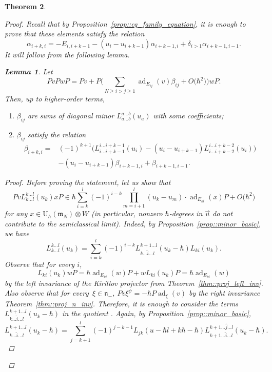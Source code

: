 \documentclass[10pt,a4paper]{article}
\numberwithin{equation}{section}
\newtheorem{Theorem}{Theorem}[section]
\newtheorem{Lemma}[Theorem]{Lemma}
\newcommand{\U}{\mathrm{U}_{\hbar}}
\newcommand{\n}{\mathfrak{n}}
\newcommand{\m}{\mathfrak{m}}
\DeclareMathOperator{\ad}{ad}
\begin{document}
\begin{Theorem}
\begin{proof}
			Recall that by Proposition~\ref{prop::cg_family_equation}, it is enough to prove that these elements satisfy the relation
			\[
			\alpha_{i+k,i} = -E_{i,i+k-1} - (u_i-u_{i+k-1}) \alpha_{i+k-1,i} + \delta_{i > 1} \alpha_{i+k-1,i-1}.
			\]
			It will follow from the following lemma.
			\begin{Lemma}
				Let
				\[
				PvPwP = Pv + P\biggl( \sum\limits_{N \geq i > j \geq 1} \ad_{E_{ij}}(v) \beta_{ij} + O\bigl(\hbar^2\bigr)\biggr)wP.
				\]
				Then, up to higher-order terms,
				\begin{enumerate}\itemsep=0pt
					\item[$(1)$] $\beta_{ij}$ are sums of diagonal minor $L_{a\dots b}^{a\dots b}(u_a)$ with some coefficients;
					\item[$(2)$] $\beta_{ij}$ satisfy the relation
					\begin{align}
							\beta_{i+k,i} ={}& (-1)^{k+1}\bigl(L_{i\dots i+k-1}^{i\dots i+k-1}(u_i) - (u_i - u_{i+k-1}) L_{i \dots i+k-2}^{i \dots i+k-2}(u_i)\bigr)\nonumber \\
							&-(u_i - u_{i+k-1}) \beta_{i+k-1,i} + \beta_{i+k-1,i-1}.\label{eq::beta_relation}
					\end{align}
				\end{enumerate}
				\begin{proof}
					Before proving the statement, let us show that
					\[
					Pv L_{k\dots l}^{k \dots l}(u_k) x P \in \hbar \sum\limits_{i=k}^l (-1)^{i-k} \prod_{m=i+1}^l (u_k - u_m) \cdot \ad_{E_{ki}}(x) P + O\bigl(\hbar^2\bigr)
					\]
					for any $x\in \U(\m_N) \otimes W$ (in particular, nonzero $\hbar$-degrees in $\vec{u}$ do not contribute to the semiclassical limit). Indeed, by Proposition~\ref{prop::minor_basic}, we have
					\[
					L_{k \dots l}^{k \dots l}(u_k) = \sum\limits_{i=k}^l (-1)^{i-k} L_{k \dots \hat{i} \dots l}^{k+1 \dots l}(u_k-\hbar) L_{ki}(u_k).
					\]
					Observe that for every $i$,
					\[
					L_{ki}(u_k) wP = \hbar \ad_{E_{ki}}(w) P + wL_{ki}(u_k)P = \hbar \ad_{E_{ki}}(w)
					\]
					by the left invariance of the Kirillov projector from Theorem~\ref{thm::proj_left_inv}. Also observe that for every~${\xi \in \n_-}$,
					$
					Pv \xi^{\psi} = - \hbar P \ad_{\xi}(v)
					$
					by the right invariance Theorem~\ref{thm::proj_n_inv}. Therefore, it is enough to consider the terms $L_{k \dots \hat{i} \dots l}^{k+1 \dots l}(u_k-\hbar)$ in the quotient \smash{$\n_-^{\psi} \backslash \U(\m_N)$}. Again, by Proposition~\ref{prop::minor_basic},
					\[
					L_{k \dots \hat{i} \dots l}^{k+1 \dots l}(u_k-\hbar) = \sum\limits_{j=k+1}^l (-1)^{j-k-1} L_{jk}(u-\hbar l + k \hbar - \hbar) L_{k+1\dots \hat{i} \dots l}^{k+1\dots \hat{j} \dots l}(u_k - \hbar).
\]
\end{proof}
\end{Lemma}
\end{proof}
\end{Theorem}
\end{document}
